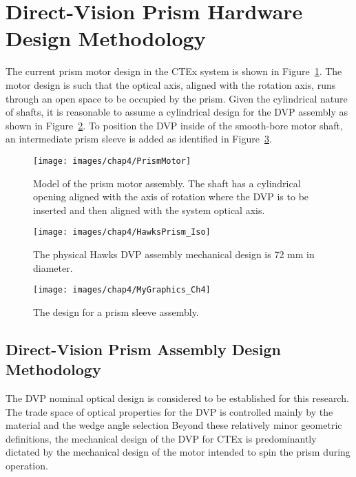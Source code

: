 \section{Direct-Vision Prism Hardware Design Methodology}
\label{sec:designMethod}

The current prism motor design in the CTEx system is shown in Figure~\ref{fig:PrismMotor}. The motor design is such that the optical axis, aligned with the rotation axis, runs through an open space to be occupied by the prism. Given the cylindrical nature of shafts, it is reasonable to assume a cylindrical design for the DVP assembly as shown in Figure~\ref{fig:HawksPrism_Iso}. To position the DVP inside of the smooth-bore motor shaft, an intermediate prism sleeve is added as identified in Figure~\ref{fig:PrismSleeveAssy_Section}. 

\begin{figure}[htb]		%
\centering
\texttt{[image: images/chap4/PrismMotor]}
\caption{Model of the prism motor assembly. The shaft has a cylindrical opening aligned with the axis of rotation where the DVP is to be inserted and then aligned with the system optical axis.}
\label{fig:PrismMotor}
\end{figure}

\begin{figure}[htb]		%
\centering
\texttt{[image: images/chap4/HawksPrism\_Iso]}
\caption{The physical Hawks DVP assembly mechanical design is 72 mm in diameter.}
\label{fig:HawksPrism_Iso}
\end{figure}

\begin{figure}[htb]		%
\centering
\texttt{[image: images/chap4/MyGraphics\_Ch4]}
\caption{The design for a prism sleeve assembly.}
\label{fig:PrismSleeveAssy_Section}
\end{figure}

\subsection{Direct-Vision Prism Assembly Design Methodology}
\label{sec:dvpDesignMethod}
The \ac{DVP} nominal optical design is considered to be established for this research. The trade space of optical properties for the DVP is controlled mainly by the material and the wedge angle selection Beyond these relatively minor geometric definitions, the mechanical design of the DVP for CTEx is predominantly dictated by the mechanical design of the motor intended to spin the prism during operation.


